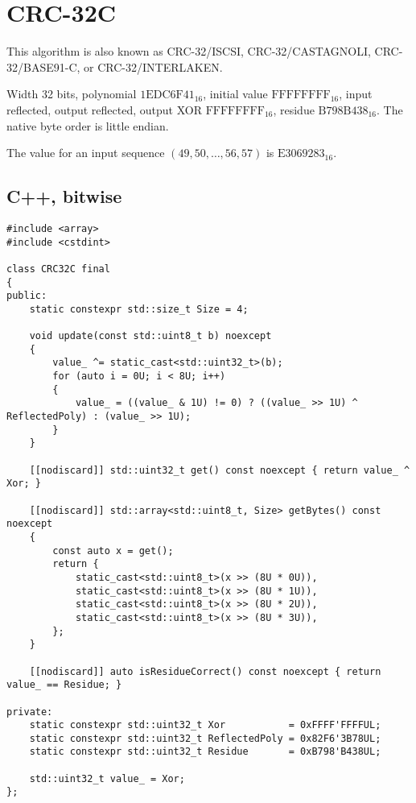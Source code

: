 \newpage
\section{CRC-32C}\label{sec:appendix_crc32c}

This algorithm is also known as CRC-32/ISCSI, CRC-32/CASTAGNOLI, CRC-32/BASE91-C, or CRC-32/INTERLAKEN.

Width 32 bits,
polynomial $\mathrm{1EDC6F41}_{16}$,
initial value $\mathrm{FFFFFFFF}_{16}$,
input reflected, output reflected,
output XOR $\mathrm{FFFFFFFF}_{16}$,
residue $\mathrm{B798B438}_{16}$.
The native byte order is little endian.

The value for an input sequence $\left(49, 50, \ldots, 56, 57\right)$ is $\mathrm{E3069283}_{16}$.

\subsection{C++, bitwise}

\begin{samepage}
\begin{verbatim}
#include <array>
#include <cstdint>

class CRC32C final
{
public:
    static constexpr std::size_t Size = 4;

    void update(const std::uint8_t b) noexcept
    {
        value_ ^= static_cast<std::uint32_t>(b);
        for (auto i = 0U; i < 8U; i++)
        {
            value_ = ((value_ & 1U) != 0) ? ((value_ >> 1U) ^ ReflectedPoly) : (value_ >> 1U);
        }
    }

    [[nodiscard]] std::uint32_t get() const noexcept { return value_ ^ Xor; }

    [[nodiscard]] std::array<std::uint8_t, Size> getBytes() const noexcept
    {
        const auto x = get();
        return {
            static_cast<std::uint8_t>(x >> (8U * 0U)),
            static_cast<std::uint8_t>(x >> (8U * 1U)),
            static_cast<std::uint8_t>(x >> (8U * 2U)),
            static_cast<std::uint8_t>(x >> (8U * 3U)),
        };
    }

    [[nodiscard]] auto isResidueCorrect() const noexcept { return value_ == Residue; }

private:
    static constexpr std::uint32_t Xor           = 0xFFFF'FFFFUL;
    static constexpr std::uint32_t ReflectedPoly = 0x82F6'3B78UL;
    static constexpr std::uint32_t Residue       = 0xB798'B438UL;

    std::uint32_t value_ = Xor;
};
\end{verbatim}
\end{samepage}

